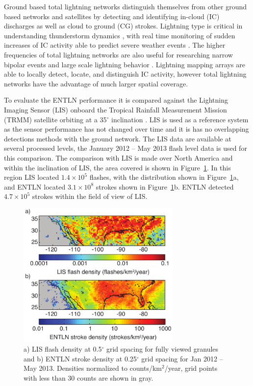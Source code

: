Ground based total lightning networks distinguish themselves from other ground based networks and satellites by detecting and identifying in-cloud (IC) discharges as well as cloud to ground (CG) strokes.
Lightning type is critical in understanding thunderstorm dynamics \citep{Williams1989}, with real time monitoring of sudden increases of IC activity able to predict severe weather events \citep{Rudlosky2013, Darden2010, Metzger2013, Schultz2009, Schultz2011}.
The higher frequencies of total lightning networks are also useful for researching narrow bipolar events \citep{Suszcynsky2003} and large scale lightning behavior \citep{Hutchins2013}.
Lightning mapping arrays are able to locally detect, locate, and distinguish IC activity, however total lightning networks have the advantage of much larger spatial coverage.

To evaluate the ENTLN performance it is compared against the Lightning Imaging Sensor (LIS) onboard the Tropical Rainfall Measurement Mission (TRMM) satellite orbiting at a 35$^\circ$ inclination \citep{Christian1999}.
LIS is used as a reference system as the sensor performance has not changed over time and it is has no overlapping detections methods with the ground network. 
The LIS data are available at several processed levels, the January 2012 -- May 2013 flash level data is used for this comparison.
The comparison with LIS is made over North America and within the inclination of LIS, the area covered is shown in Figure~\ref{entln_lis:fig:density}.
In this region LIS located $1.4\times10^5$ flashes, with the distribution shown in Figure~\ref{entln_lis:fig:density}a, and ENTLN located $3.1\times10^8$ strokes shown in Figure~\ref{entln_lis:fig:density}b.
ENTLN detected $4.7\times10^5$ strokes within the field of view of LIS.

\begin{figure}[t]
   \centering
   \noindent\includegraphics[width=19pc,angle=0]{entln_lis/Figures/density.pdf}
   \caption{a) LIS flash density at 0.5$^\circ$ grid spacing for fully viewed granules and
   		b) ENTLN stroke density at 0.25$^\circ$ grid spacing for Jan 2012 -- May 2013.
   		Densities normalized to counts/km$^2$/year, grid points with less than 30 counts are shown in gray.}
   \label{entln_lis:fig:density}
\end{figure}

